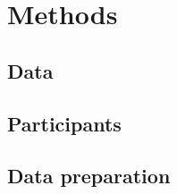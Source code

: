 \documentclass{article}
\begin{document}




\section{Methods}\label{sec:methods}

\subsection{Data}\label{sec:data}



\subsection{Participants}\label{sec:methods_participants}





\subsection{Data preparation}\label{sec:data_preparation}
\end{document}
